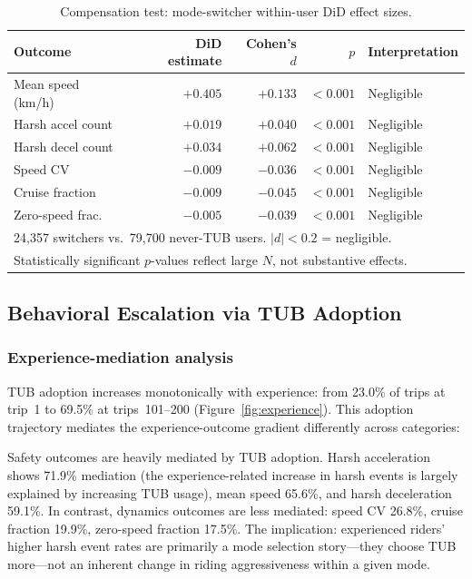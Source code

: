 \begin{table}[htbp]
\centering
\caption{Compensation test: mode-switcher within-user DiD effect sizes.}
\label{tab:compensation}
\small
\begin{tabular}{lrrrl}
\toprule
\textbf{Outcome} & \textbf{DiD estimate} & \textbf{Cohen's} $d$ & $p$ & \textbf{Interpretation} \\
\midrule
Mean speed (km/h) & $+0.405$ & $+0.133$ & $<0.001$ & Negligible \\
Harsh accel count & $+0.019$ & $+0.040$ & $<0.001$ & Negligible \\
Harsh decel count & $+0.034$ & $+0.062$ & $<0.001$ & Negligible \\
Speed CV & $-0.009$ & $-0.036$ & $<0.001$ & Negligible \\
Cruise fraction & $-0.009$ & $-0.045$ & $<0.001$ & Negligible \\
Zero-speed frac. & $-0.005$ & $-0.039$ & $<0.001$ & Negligible \\
\bottomrule
\multicolumn{5}{l}{\footnotesize 24,357 switchers vs.\ 79,700 never-TUB users. $|d| < 0.2$ = negligible.} \\
\multicolumn{5}{l}{\footnotesize Statistically significant $p$-values reflect large $N$, not substantive effects.} \\
\end{tabular}
\end{table}

\subsection{Behavioral Escalation via TUB Adoption}
\label{sec:res_escalation}

\subsubsection{Experience-mediation analysis}

TUB adoption increases monotonically with experience: from 23.0\% of trips at trip~1 to 69.5\% at trips~101--200 (Figure~\ref{fig:experience}). This adoption trajectory mediates the experience-outcome gradient differently across categories:

Safety outcomes are heavily mediated by TUB adoption. Harsh acceleration shows 71.9\% mediation (the experience-related increase in harsh events is largely explained by increasing TUB usage), mean speed 65.6\%, and harsh deceleration 59.1\%. In contrast, dynamics outcomes are less mediated: speed CV 26.8\%, cruise fraction 19.9\%, zero-speed fraction 17.5\%. The implication: experienced riders' higher harsh event rates are primarily a mode selection story---they choose TUB more---not an inherent change in riding aggressiveness within a given mode.

